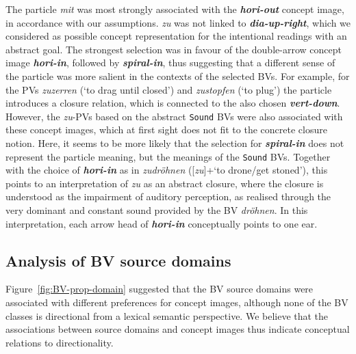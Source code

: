 \documentclass[output=paper]{langsci/langscibook}
\newcommand{\textci}[1]{\textit{\textbf{#1}}}
\begin{document}
The particle \textit{mit} was most strongly associated with the
\textci{hori-out} concept image, in accordance with our assumptions. \textit{zu}
was not linked to \textci{dia-up-right}, which we considered as
possible concept representation for the intentional readings with an
abstract goal. The strongest selection was in favour of the
double-arrow concept image \textci{hori-in}, followed by \textci{spiral-in}, thus
suggesting that a different sense of the particle was more salient in
the contexts of the selected BVs. For example, for the PVs
\textit{zuzerren} (`to drag until closed') and \textit{zustopfen} (`to
plug') the particle introduces a closure relation, which is connected
to the also chosen \textci{vert-down}. However, the \textit{zu}-PVs
based on the abstract \texttt{Sound} BVs were also associated with
these concept images, which at first sight does not fit to the concrete closure
notion. Here, it seems to be more likely that the selection for
\textci{spiral-in} does not represent the particle meaning, but the
meanings of the \texttt{Sound} BVs. Together with the choice of
\textci{hori-in} as in \textit{zudröhnen} ([\textit{zu}]+`to drone/get
stoned'), this points to an interpretation of \textit{zu} as an
abstract closure, where the closure is understood as the impairment of
auditory perception, as realised through the very dominant and
constant sound provided by the BV \textit{dröhnen}. In this
interpretation, each arrow head of \textci{hori-in} conceptually
points to one ear.

\subsection{Analysis of BV source domains}
\label{sec:disc-domain}

Figure~\ref{fig:BV-prop-domain} suggested that the BV source domains
were associated with different preferences for concept images,
although none of the BV classes is directional from a lexical semantic
perspective. We believe that the associations between source domains
and concept images thus indicate conceptual relations to
directionality.
\end{document}

